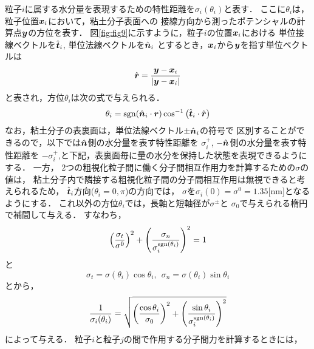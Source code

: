 ﻿\documentclass[11pt,a4j]{jarticle}
\begin{document}
粒子$i$に属する水分量を表現するための特性距離を$\sigma_i(\theta_i)$と表す．
ここに$\theta_i$は，粒子位置$\mbox{\boldmath $x$}_i$において，粘土分子表面への
接線方向から測ったポテンシャルの計算点$\mbox{\boldmath $y$}$の方位を表す．
図\ref{fig:fig9}に示すように，粒子$i$の位置$\mbox{\boldmath $x$}_i$における
単位接線ベクトルを$\hat{\mbox{\boldmath $t$}}_i$, 単位法線ベクトルを$\hat{\mbox{\boldmath $n$}}_i$
とするとき，$\mbox{\boldmath $x$}_i$から$\mbox{\boldmath $y$}$を指す単位ベクトルは
\begin{equation}
	\hat{\mbox{\boldmath $r$}}=\frac{\mbox{\boldmath $y$}-\mbox{\boldmath $x$}_i}{\left| \mbox{\boldmath $y$}-\mbox{\boldmath $x$}_i\right|}
	\label{eqn:def_rhat}
\end{equation}
と表され，方位$\theta_i$は次の式で与えられる．
\begin{equation}
	\theta_i = {\rm sgn} (\hat{\mbox{\boldmath $n$}}_i \cdot \mbox{\boldmath $r$}) 
	\cos^{-1}\left( \hat{\mbox{\boldmath $t$}}_i\cdot \hat{\mbox{\boldmath $r$}}\right)
	\label{eqn:def_th}
\end{equation}
なお，粘土分子の表裏面は，単位法線ベクトル$\pm \hat{\mbox{\boldmath $n$}}_i$の符号で
区別することができるので，以下では$\hat{\mbox{\boldmath $n$}}$側の水分量を表す特性距離を
$\sigma^+_i$, $-\hat{\mbox{\boldmath $n$}}$側の水分量を表す特性距離を
$-\sigma^+_i$,と下記，表裏面毎に量の水分を保持した状態を表現できるようにする．
一方， 2つの粗視化粒子間に働く分子間相互作用力を計算するための${\sigma}$の値は，
粘土分子内で隣接する粗視化粒子間の分子間相互作用は無視できると考えられるため，
$\hat{\mbox{\boldmath $t$}}_i$方向($\theta_i=0,\pi$)の方向では，
$\sigma$を$\sigma_i(0)=\sigma^0=1.35$[nm]となるようにする．
これ以外の方位$\theta_i$では，長軸と短軸径が$\sigma^\pm$と
$\sigma_0$で与えられる楕円で補間して与える．
すなわち，
\begin{equation}
	\left( \frac{\sigma_t}{\sigma^0} \right)^2
	+
	\left( \frac{\sigma_n}{\sigma^{{\rm sgn}(\theta_i)}_i} \right)^2
	=
	1
	\label{eqn:sigma_ellip}
\end{equation}
と
\begin{equation}
	\sigma_t=\sigma(\theta_i)\cos\theta_i, \ \ 
	\sigma_n=\sigma(\theta_i)\sin\theta_i
	\label{eqn:local_basis}
\end{equation}
とから，
\begin{equation}
	\frac{1}{\sigma_i(\theta_i)}
	=
	\sqrt{
		\left( 
		\frac{\cos\theta_i}{\sigma_0} 
		\right)^2
		+
		\left( 
			\frac{\sin\theta_i}{\sigma_i^{{\rm sgn}(\theta_i)}}
		\right)^2
	}
	\label{eqn:sigma_th}
\end{equation}
によって与える．
粒子$i$と粒子$j$の間で作用する分子間力を計算するときには，
\end{document}
